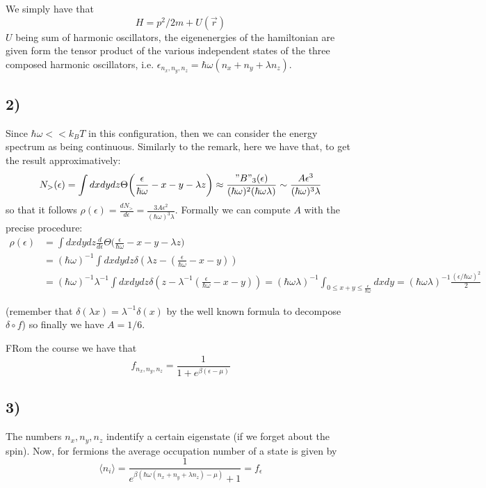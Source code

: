 \documentclass[10pt,a4paper]{book}
\begin{document}
We simply have that 
$$H=p^2/2m+U(\vec{r})$$
$U$ being sum of harmonic oscillators, the eigenenergies of the hamiltonian are given form the tensor product of the various independent states of the three composed harmonic oscillators, i.e. $\epsilon_{n_x,n_y,n_z}=\hbar\omega(n_x+n_y+\lambda n_z)$. 

\subsection*{2)}
Since $\hbar\omega<<k_BT$ in this configuration, then we can consider the energy spectrum as being continuous. 
Similarly to the remark, here we have that, to get the result approximatively:
$$N_{>}(\epsilon)=\int dx dydz\Theta\bigg(\frac{\epsilon}{\hbar\omega}-x-y-\lambda z\bigg)\approx \frac{"B"_3(\epsilon)}{(\hbar\omega)^2(\hbar\omega\lambda)}\sim \frac{A\epsilon^3}{(\hbar\omega)^3\lambda}$$ so that it follows $\rho(\epsilon)=\frac{dN_>}{d\epsilon}=\frac{3A\epsilon^2}{(\hbar\omega)^3\lambda}$.
Formally we can compute $A$ with the precise procedure:
\begin{align*}
\rho(\epsilon)&=\int dxdydz \frac{d}{d\epsilon}\Theta\bigg(\frac{\epsilon}{\hbar\omega}-x-y-\lambda z\bigg)\\
&=(\hbar\omega)^{-1}\int dxdydz\delta(\lambda z-(\frac{\epsilon}{\hbar \omega}-x-y))\\
&=(\hbar\omega)^{-1}\lambda^{-1}\int dxdydz\delta( z-\lambda^{-1}(\frac{\epsilon}{\hbar\omega}-x-y))=(\hbar\omega\lambda)^{-1}\int_{0\leq x+y\leq\frac{\epsilon}{\hbar\omega}} dxdy=(\hbar\omega\lambda)^{-1}\frac{(\epsilon/\hbar\omega)^2}{2}
\end{align*}

(remember that $\delta(\lambda x)=\lambda^{-1}\delta(x)$ by the well known formula to decompose $\delta\circ f$) so finally we have $A=1/6$.

FRom the course we have that
$$f_{n_x,n_y,n_z}=\frac{1}{1+e^{\beta(\epsilon-\mu)}}$$

\subsection*{3)}
The numbers $n_x,n_y,n_z$ indentify a certain eigenstate (if we forget about the spin). Now, for fermions the average occupation number of a state is given by 
$$\langle n_i\rangle =\frac{1}{e^{\beta(\hbar\omega(n_x+n_y+\lambda n_z)-\mu)}+1}=f_{\epsilon}$$
\end{document}
